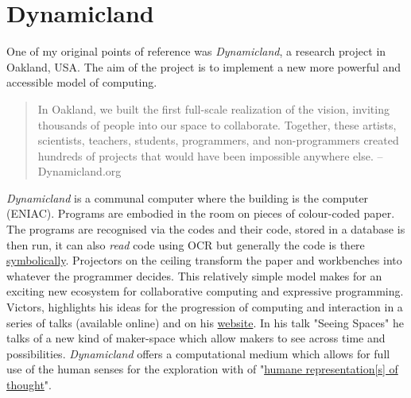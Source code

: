 \documentclass[12pt]{report}
\begin{document}
\section{Dynamicland}
\label{sec:org8edbb77}

One of my original points of reference was \emph{Dynamicland}, a research project in
Oakland, USA. The aim of the project is to implement a new more powerful and
accessible model of computing.

\begin{quote}


In Oakland, we built the first full-scale realization of the vision, inviting
thousands of people into our space to collaborate. Together, these artists,
scientists, teachers, students, programmers, and non-programmers created
hundreds of projects that would have been impossible anywhere else.
-- Dynamicland.org 
\end{quote}


\emph{Dynamicland} is a communal computer where the building is the computer (ENIAC).
Programs are embodied in the room on pieces of colour-coded paper. The programs
are recognised via the codes and their code, stored in a database is then run,
it can also \emph{read} code using OCR but generally the code is there \href{https://thenewstack.io/dynamicland-rethinks-computer-interfaces/}{symbolically}.
Projectors on the ceiling transform the paper and workbenches into whatever the
programmer decides. This relatively simple model makes for an exciting new
ecosystem for collaborative computing and expressive programming. Victors,
highlights his ideas for the progression of computing and interaction in a
series of talks (available online) and on his \href{http://worrydream.com}{website}. In his talk "Seeing
Spaces" he talks of a new kind of maker-space which allow makers to see across
time and possibilities. \emph{Dynamicland} offers a computational medium which allows
for full use of the human senses for the exploration with of "\href{https://vimeo.com/115154289}{humane
representation[s] of thought}". \cite{VictorKayDynamicLand} \\
\end{document}
